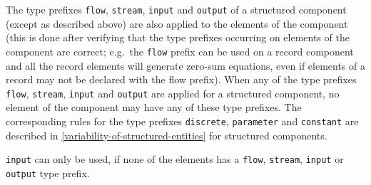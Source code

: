 The type prefixes \lstinline!flow!, \lstinline!stream!, \lstinline!input!
and \lstinline!output! of a structured
component (except as described above) are also applied to the elements
of the component (this is done after verifying that the type prefixes
occurring on elements of the component are correct; e.g.\ the \lstinline!flow! prefix
can be used on a record component and all the record elements will
generate zero-sum equations, even if elements of a record may not be
declared with the flow prefix). When any of the type prefixes \lstinline!flow!,
\lstinline!stream!, \lstinline!input! and \lstinline!output! are applied for a structured component, no
element of the component may have any of these type prefixes.
The corresponding rules for the type prefixes \lstinline!discrete!,
\lstinline!parameter! and \lstinline!constant! are described in \cref{variability-of-structured-entities} for structured
components.

\begin{example}
\lstinline!input! can only be used, if none of the elements has a \lstinline!flow!, \lstinline!stream!, \lstinline!input! or
\lstinline!output! type prefix.
\end{example}

